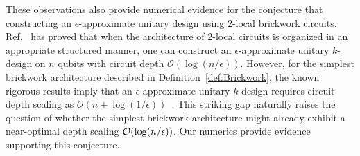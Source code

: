 \documentclass[aps,prl,twocolumn,nofootinbib,superscriptaddress,10pt]{revtex4-2}
\let\originalleft\left
\let\originalright\right
\renewcommand{\left}{\mathopen{}\mathclose\bgroup\originalleft}
\renewcommand{\right}{\aftergroup\egroup\originalright}
\theoremstyle{plain}
\theoremstyle{definition}
\begin{document}
These observations also provide numerical evidence for the conjecture that constructing an $\epsilon$-approximate unitary design using $2$-local brickwork circuits. Ref.~\cite{schuster2025random} has proved that when the architecture of 2-local circuits is organized in an appropriate structured manner, one can construct an $\epsilon$-approximate unitary $k$-design on $n$ qubits with circuit depth $\mathcal{O}(\log(n/\epsilon))$. However, for the simplest brickwork architecture described in Definition~\ref {def:Brickwork}, the known rigorous results imply that an $\epsilon$-approximate unitary $k$-design requires circuit depth scaling as $\mathcal{O}(n+\log(1/\epsilon))$~\cite{Brandao2016LocalDesign,Haferkamp2022Interleaved,chen2024incompressibility}. This striking gap naturally raises the question of whether the simplest brickwork architecture might already exhibit a near-optimal depth scaling $\mathcal{O}\left(\log(n/\epsilon)\right)$. Our numerics provide evidence supporting this conjecture.

\end{document}
